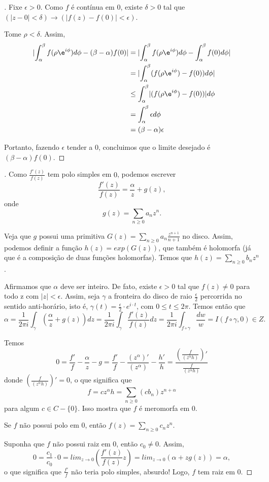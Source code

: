 \begin{proof}[]

Fixe $\epsilon>0$.
Como $f$ é contínua em $0$, existe $\delta>0$ tal que $(\lvert z-0 \rvert < \delta)\rightarrow(\lvert f(z)-f(0)\rvert<\epsilon)$.

Tome $\rho<\delta$.
Assim,
\begin{align*}
\lvert \int_{\alpha}^{\beta}f(\rho\e^{i\phi})d\phi -(\beta-\alpha)f(0)\rvert &= \lvert \int_{\alpha}^{\beta}f(\rho\e^{i\phi})d\phi -\int_{\alpha}^{\beta}f(0)d\phi \rvert  \\
&=\lvert \int_{\alpha}^{\beta}(f(\rho\e^{i\phi})-f(0))d\phi\rvert \\
&\leq \int_{\alpha}^{\beta}\lvert (f(\rho\e^{i\phi})-f(0))\rvert d\phi \\
&=\int_{\alpha}^{\beta}\epsilon d\phi \\
&=(\beta -\alpha)\epsilon \\
\end{align*}

Portanto, fazendo $\epsilon$ tender a $0$, concluimos que o limite desejado é $(\beta - \alpha)f(0)$.

\end{proof}


\begin{proof}[]

Como $\frac{f'(z)}{f(z)}$ tem polo simples em $0$, podemos escrever $$\frac{f'(z)}{f(z)}=\frac{\alpha}{z}+g(z),$$ onde $$g(z)=\sum_{n\geq 0}a_nz^n.$$

Veja que $g$ possui uma primitiva $G(z)=\sum_{n\geq 0}a_n\frac{z^{n+1}}{n+1}$ no disco. Assim, podemos definir a função $h(z)=exp(G(z))$, que também é holomorfa (já que é a composição de duas funções holomorfas). Temos que $h(z)=\sum_{n\geq 0}b_nz^n$.

Afirmamos que $\alpha$ deve ser inteiro. De fato, existe $\epsilon>0$ tal que $f(z)\neq 0$ para todo z com $\lvert z\rvert <\epsilon$. Assim, seja $\gamma$ a fronteira do disco de raio $\frac{\epsilon}{2}$ percorrida no sentido anti-horário, isto é, $\gamma(t)=\frac{\epsilon}{2}\cdot e^{i\cdot t}$, com $0\leq t\leq 2\pi$. Temos então que $$\alpha=\frac{1}{2\pi i}\int_{\gamma}\left(\frac{\alpha}{z}+g(z)\right) dz=\frac{1}{2\pi i}\int_{\gamma}\frac{f'(z)}{f(z)}dz=\frac{1}{2\pi i}\int_{f\circ\gamma}\frac{dw}{w}=I(f \circ \gamma, 0)\in Z.$$

Temos $$0=\frac{f'}{f}-\frac{\alpha}{z}-g=\frac{f'}{f}-\frac{(z^{\alpha})'}{(z^{\alpha})}-\frac{h'}{h}=\frac{(\frac{f}{(z^{\alpha}h)})'}{\frac{f}{(z^{\alpha}h)}}$$ donde $(\frac{f}{(z^{\alpha}h)})'=0$, o que significa que $$f=cz^{\alpha}h=\sum_{n \geq 0}(cb_n)z^{n+\alpha}$$ para algum $c\in C-\{0\}$. Isso mostra que $f$ é meromorfa em $0$.

Se $f$ não possui polo em $0$, então $f(z)=\sum_{n\geq 0}c_nz^n$.

Suponha que $f$ não possui raiz em $0$, então $c_0\neq 0$. Assim, $$0=\frac{c_1}{c_0}\cdot 0=lim_{z\rightarrow 0}\left(\frac{f'(z)}{f(z)}z\right)=lim_{z\rightarrow 0}\left(\alpha+zg(z)\right)=\alpha,$$ o que significa que $\frac{f'}{f}$ não teria polo simples, absurdo! Logo, $f$ tem raiz em $0$.

\end{proof}


